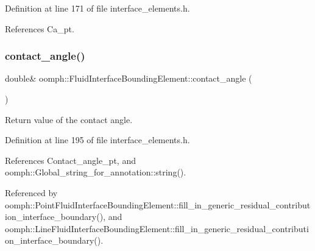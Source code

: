 Definition at line 171 of file interface\+\_\+elements.\+h.



References Ca\+\_\+pt.

\mbox{\label{classoomph_1_1FluidInterfaceBoundingElement_a6803f4ea8de0b3fe17b703d7489c8147}} 
\subsubsection{\texorpdfstring{contact\+\_\+angle()}{contact\_angle()}}
{\footnotesize\ttfamily double\& oomph\+::\+Fluid\+Interface\+Bounding\+Element\+::contact\+\_\+angle (\begin{DoxyParamCaption}{ }\end{DoxyParamCaption})\hspace{0.3cm}{\ttfamily [inline]}}



Return value of the contact angle. 



Definition at line 195 of file interface\+\_\+elements.\+h.



References Contact\+\_\+angle\+\_\+pt, and oomph\+::\+Global\+\_\+string\+\_\+for\+\_\+annotation\+::string().



Referenced by oomph\+::\+Point\+Fluid\+Interface\+Bounding\+Element\+::fill\+\_\+in\+\_\+generic\+\_\+residual\+\_\+contribution\+\_\+interface\+\_\+boundary(), and oomph\+::\+Line\+Fluid\+Interface\+Bounding\+Element\+::fill\+\_\+in\+\_\+generic\+\_\+residual\+\_\+contribution\+\_\+interface\+\_\+boundary().

\mbox{\label{classoomph_1_1FluidInterfaceBoundingElement_a00fc3fdc8c3b7d149ba2c6de44f4a150}} 
